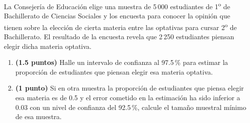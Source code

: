 
La Consejería de Educación elige una muestra de 5\,000 estudiantes de 1\textsuperscript{o} de Bachillerato de Ciencias Sociales y los encuesta para conocer la opinión que tienen sobre la elección de cierta materia entre las optativas para cursar 2\textsuperscript{o} de Bachillerato. El resultado de la encuesta revela que 2\,250 estudiantes piensan elegir dicha materia optativa.
\begin{enumerate}[label=\alph*),leftmargin=2.4em]
  \item \textbf{(1.5 puntos)} Halle un intervalo de confianza al 97.5\,\% para estimar la proporción de estudiantes que piensan elegir esa materia optativa.
  \item \textbf{(1 punto)} Si en otra muestra la proporción de estudiantes que piensa elegir esa materia es de 0.5 y el error cometido en la estimación ha sido inferior a 0.03 con un nivel de confianza del 92.5\,\%, calcule el tamaño muestral mínimo de esa muestra.
\end{enumerate}
